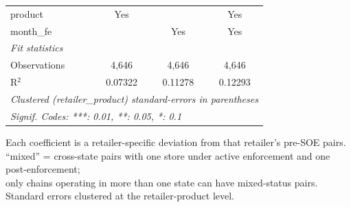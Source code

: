 \begin{table}[htbp]
\begin{tabular}{lccc}
      product                         & Yes            &               & Yes\\  
      month\_fe                       &                & Yes           & Yes\\  
      \midrule
      \emph{Fit statistics}\\
      Observations                    & 4,646          & 4,646         & 4,646\\  
      R$^2$                           & 0.07322        & 0.11278       & 0.12293\\  
      \midrule \midrule
      \multicolumn{4}{l}{\emph{Clustered (retailer\_product) standard-errors in parentheses}}\\
      \multicolumn{4}{l}{\emph{Signif. Codes: ***: 0.01, **: 0.05, *: 0.1}}\\
   \end{tabular}
   
   \par \raggedright 
   Each coefficient is a retailer-specific deviation from that retailer's pre-SOE pairs.\\
   ``mixed'' = cross-state pairs with one store under active enforcement and one post-enforcement;\\
   only chains operating in more than one state can have mixed-status pairs.\\
   Standard errors clustered at the retailer-product level.
\end{table}


